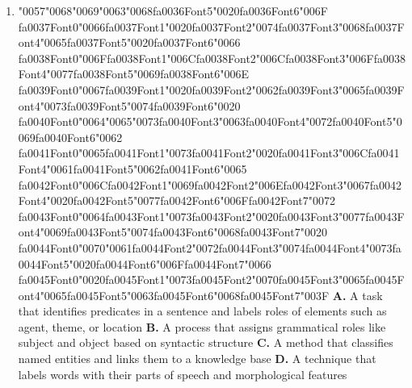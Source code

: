 \documentclass[11pt]{article}
\begin{document}
\begin{enumerate}[leftmargin=*]
  \item {\char"0057}{\char"0068}{\char"0069}{\char"0063}{\char"0068}{\csname fa0036Font5\endcsname\char"0020}{\csname fa0036Font6\endcsname\char"006F} {\csname fa0037Font0\endcsname\char"0066}{\csname fa0037Font1\endcsname\char"0020}{\csname fa0037Font2\endcsname\char"0074}{\csname fa0037Font3\endcsname\char"0068}{\csname fa0037Font4\endcsname\char"0065}{\csname fa0037Font5\endcsname\char"0020}{\csname fa0037Font6\endcsname\char"0066} {\csname fa0038Font0\endcsname\char"006F}{\csname fa0038Font1\endcsname\char"006C}{\csname fa0038Font2\endcsname\char"006C}{\csname fa0038Font3\endcsname\char"006F}{\csname fa0038Font4\endcsname\char"0077}{\csname fa0038Font5\endcsname\char"0069}{\csname fa0038Font6\endcsname\char"006E} {\csname fa0039Font0\endcsname\char"0067}{\csname fa0039Font1\endcsname\char"0020}{\csname fa0039Font2\endcsname\char"0062}{\csname fa0039Font3\endcsname\char"0065}{\csname fa0039Font4\endcsname\char"0073}{\csname fa0039Font5\endcsname\char"0074}{\csname fa0039Font6\endcsname\char"0020} {\csname fa0040Font0\endcsname\char"0064}{\char"0065}{\char"0073}{\csname fa0040Font3\endcsname\char"0063}{\csname fa0040Font4\endcsname\char"0072}{\csname fa0040Font5\endcsname\char"0069}{\csname fa0040Font6\endcsname\char"0062} {\csname fa0041Font0\endcsname\char"0065}{\csname fa0041Font1\endcsname\char"0073}{\csname fa0041Font2\endcsname\char"0020}{\csname fa0041Font3\endcsname\char"006C}{\csname fa0041Font4\endcsname\char"0061}{\csname fa0041Font5\endcsname\char"0062}{\csname fa0041Font6\endcsname\char"0065} {\csname fa0042Font0\endcsname\char"006C}{\csname fa0042Font1\endcsname\char"0069}{\csname fa0042Font2\endcsname\char"006E}{\csname fa0042Font3\endcsname\char"0067}{\csname fa0042Font4\endcsname\char"0020}{\csname fa0042Font5\endcsname\char"0077}{\csname fa0042Font6\endcsname\char"006F}{\csname fa0042Font7\endcsname\char"0072} {\csname fa0043Font0\endcsname\char"0064}{\csname fa0043Font1\endcsname\char"0073}{\csname fa0043Font2\endcsname\char"0020}{\csname fa0043Font3\endcsname\char"0077}{\csname fa0043Font4\endcsname\char"0069}{\csname fa0043Font5\endcsname\char"0074}{\csname fa0043Font6\endcsname\char"0068}{\csname fa0043Font7\endcsname\char"0020} {\csname fa0044Font0\endcsname\char"0070}{\char"0061}{\csname fa0044Font2\endcsname\char"0072}{\csname fa0044Font3\endcsname\char"0074}{\csname fa0044Font4\endcsname\char"0073}{\csname fa0044Font5\endcsname\char"0020}{\csname fa0044Font6\endcsname\char"006F}{\csname fa0044Font7\endcsname\char"0066} {\csname fa0045Font0\endcsname\char"0020}{\csname fa0045Font1\endcsname\char"0073}{\csname fa0045Font2\endcsname\char"0070}{\csname fa0045Font3\endcsname\char"0065}{\csname fa0045Font4\endcsname\char"0065}{\csname fa0045Font5\endcsname\char"0063}{\csname fa0045Font6\endcsname\char"0068}{\csname fa0045Font7\endcsname\char"003F}
    \textbf{A.} A task that identifies predicates in a sentence and labels roles of elements such as agent, theme, or location
    \textbf{B.} A process that assigns grammatical roles like subject and object based on syntactic structure
    \textbf{C.} A method that classifies named entities and links them to a knowledge base
    \textbf{D.} A technique that labels words with their parts of speech and morphological features


\end{enumerate}
\end{document}
